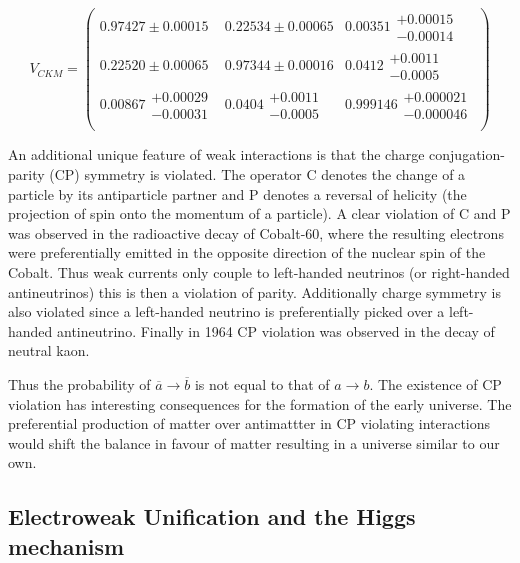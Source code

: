 \begin{equation}
\label{eq:TheoryWeakCKM}
V_{CKM}
=
\begin{pmatrix}
  0.97427\pm0.00015 & 0.22534\pm0.00065 & 0.00351\substack{+0.00015\\-0.00014} \\
  0.22520\pm0.00065 & 0.97344\pm0.00016 & 0.0412\substack{+0.0011\\-0.0005} \\
  0.00867\substack{+0.00029\\-0.00031} & 0.0404\substack{+0.0011\\-0.0005} & 0.999146\substack{+0.000021\\-0.000046} \\
\end{pmatrix}
\end{equation}

An additional unique feature of weak interactions is that the charge conjugation-parity (CP) symmetry is violated. The operator C denotes the change of a particle by its antiparticle partner and P denotes a reversal of helicity (the projection of spin onto the momentum of a particle). A clear violation of C and P was observed in the radioactive decay of Cobalt-60, where the resulting electrons were preferentially emitted in the opposite direction of the nuclear spin of the Cobalt. Thus weak currents only couple to left-handed neutrinos (or right-handed antineutrinos) this is then a violation of parity. Additionally charge symmetry is also violated since a left-handed neutrino is preferentially picked over a left-handed antineutrino. Finally in 1964 CP violation was observed in the decay of neutral kaon.

Thus the probability of $\overline{a}\rightarrow \overline{b}$ is not equal to that of $a\rightarrow b$. The existence of CP violation has interesting consequences for the formation of the early universe. The preferential production of matter over antimattter in CP violating interactions would shift the balance in favour of matter resulting in a universe similar to our own.

\subsection{Electroweak Unification and the Higgs mechanism}
